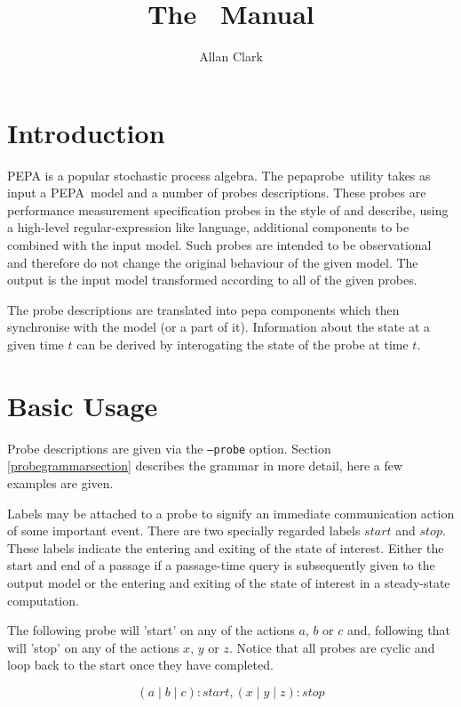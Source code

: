 \documentclass[10pt,a4paper]{article}
\title{The \pepaprobe\ Manual}
\author{
Allan Clark
}
\newcommand{\pepaprobe}{\textsf{pepaprobe}}
\newcommand{\pepa}{\textrm{PEPA}}
\begin{document}
\maketitle


\section{Introduction}
\pepa\cite{pepa} is a popular stochastic process algebra.
The \pepaprobe\ utility takes as input a \pepa\ model and a number of
probes descriptions. 
These probes are performance measurement specification probes 
in the style of \cite{stochasticprobes} and describe,
using a high-level regular-expression like language, additional components
to be combined with the input model. Such probes are intended to
be observational and therefore do not change the original behaviour of the
given model. 
The output is the input model transformed according to all of the
given probes.

The probe descriptions are translated into pepa components which then
synchronise with the model (or a part of it).
Information about the state at a given time $t$ can be derived by
interogating the state of the probe at time $t$.

\section{Basic Usage}
Probe descriptions are given via the \texttt{--probe} option.
Section \ref{probegrammarsection} describes the grammar in more detail,
here a few examples are given.

Labels may be attached to a probe to signify an immediate communication
action of some important event. There are two specially regarded labels
$start$ and $stop$. These labels indicate the entering and exiting of
the state of interest. Either the start and end of a passage if a
passage-time query is subsequently given to the output model or the
entering and exiting of the state of interest in a steady-state computation.

The following probe will 'start' on any of the actions $a$, $b$ or $c$ and,
following that will 'stop' on any of the actions $x$, $y$ or $z$.
Notice that all probes are cyclic and loop back to the start once they have
completed.

\begin{displaymath}
(a \mid b \mid c) : start, (x \mid y \mid z) : stop
\end{displaymath}
\end{document}
